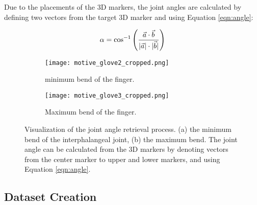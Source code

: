 \documentclass[../main.tex]{subfiles}
\begin{document}
Due to the placements of the 3D markers, the joint angles are calculated by defining two vectors from the target 3D marker and using Equation \eqref{eqn:angle}:

\begin{equation}
\label{eqn:angle}
\alpha = \cos^{-1}\left({\frac{\vec{a} \cdot \vec{b}}{ \lvert \vec{a} \rvert \cdot \lvert \vec{b} \rvert }}\right)
\end{equation}


\begin{figure}[H]
    \begin{subfigure}[b]{0.49\textwidth}
        \centering
        \texttt{[image: motive\_glove2\_cropped.png]}
        \caption{minimum bend of the finger.}
        \label{fig:minbend}
    \end{subfigure}
    \hfill
    \begin{subfigure}[b]{0.49\textwidth}
        \centering
        \texttt{[image: motive\_glove3\_cropped.png]}
        \caption{Maximum bend of the finger.}
        \label{fig:maxbend}
    \end{subfigure}
    \caption{Visualization of the joint angle retrieval process. (a) the minimum bend of the \gls{interphalangeal joint}, (b) the maximum bend. The joint angle can be calculated from the 3D markers by denoting vectors from the center marker to upper and lower markers, and using Equation \eqref{eqn:angle}.}

\end{figure}

\subsection{Dataset Creation}
\label{sec:dataset}
\end{document}
